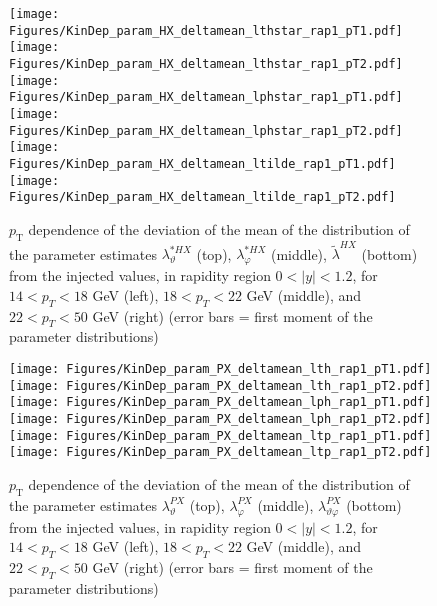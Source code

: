 \documentclass[12pt]{article}
\newcommand{\pT}{p_\mathrm{T}}
\newcommand{\absy}{\left |  y \right |}
\newcommand{\lamtildeHX}{\tilde{\lambda}^{\scriptscriptstyle HX}}
\newcommand{\lamthstarHX}{\lambda^{* \scriptscriptstyle HX}_\vartheta}
\newcommand{\lamphstarHX}{\lambda^{* \scriptscriptstyle HX}_\varphi}
\newcommand{\lamthPX}{\lambda^{\scriptscriptstyle PX}_\vartheta}
\newcommand{\lamphPX}{\lambda^{\scriptscriptstyle PX}_\varphi}
\newcommand{\lamthphPX}{\lambda^{\scriptscriptstyle PX}_{\vartheta \varphi}}
\begin{document}
\begin{figure}[htbp]
\centering
\texttt{[image: Figures/KinDep\_param\_HX\_deltamean\_lthstar\_rap1\_pT1.pdf]}
\texttt{[image: Figures/KinDep\_param\_HX\_deltamean\_lthstar\_rap1\_pT2.pdf]}
\texttt{[image: Figures/KinDep\_param\_HX\_deltamean\_lphstar\_rap1\_pT1.pdf]}
\texttt{[image: Figures/KinDep\_param\_HX\_deltamean\_lphstar\_rap1\_pT2.pdf]}
\texttt{[image: Figures/KinDep\_param\_HX\_deltamean\_ltilde\_rap1\_pT1.pdf]}
\texttt{[image: Figures/KinDep\_param\_HX\_deltamean\_ltilde\_rap1\_pT2.pdf]}
\caption{$\pT$ dependence of the deviation of the mean of the distribution of
the parameter estimates $\lamthstarHX$ (top), $\lamphstarHX$ (middle),
$\lamtildeHX$ (bottom) from the injected values, in rapidity
region $0<\absy<1.2$, for $14 < p_T < 18$ GeV (left), $18 < p_T < 22$ GeV (middle), and $22 < p_T < 50$ GeV (right) (error bars = first moment of
the parameter distributions)}
\end{figure}
\clearpage











\begin{figure}[htbp]
\centering
\texttt{[image: Figures/KinDep\_param\_PX\_deltamean\_lth\_rap1\_pT1.pdf]}
\texttt{[image: Figures/KinDep\_param\_PX\_deltamean\_lth\_rap1\_pT2.pdf]}
\texttt{[image: Figures/KinDep\_param\_PX\_deltamean\_lph\_rap1\_pT1.pdf]}
\texttt{[image: Figures/KinDep\_param\_PX\_deltamean\_lph\_rap1\_pT2.pdf]}
\texttt{[image: Figures/KinDep\_param\_PX\_deltamean\_ltp\_rap1\_pT1.pdf]}
\texttt{[image: Figures/KinDep\_param\_PX\_deltamean\_ltp\_rap1\_pT2.pdf]}
\caption{$\pT$ dependence of the deviation of the mean of the distribution of
the parameter estimates $\lamthPX$ (top), $\lamphPX$ (middle), $\lamthphPX$
(bottom) from the injected values, in rapidity
region $0<\absy<1.2$, for $14 < p_T < 18$ GeV (left), $18 < p_T < 22$ GeV (middle), and $22 < p_T < 50$ GeV (right) (error bars = first moment of the parameter
distributions)}
\end{figure}
\clearpage
\end{document}
